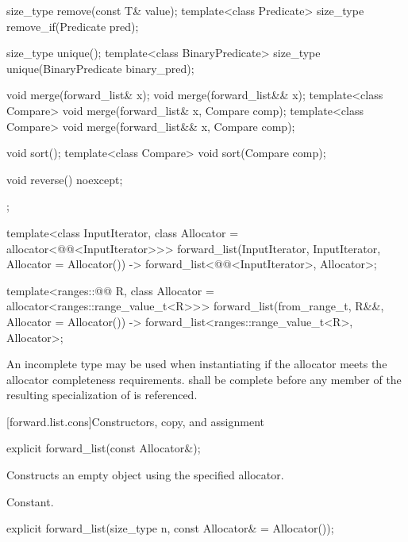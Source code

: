 \begin{codeblock}
{{    size_type remove(const T& value);
    template<class Predicate> size_type remove_if(Predicate pred);

    size_type unique();
    template<class BinaryPredicate> size_type unique(BinaryPredicate binary_pred);

    void merge(forward_list& x);
    void merge(forward_list&& x);
    template<class Compare> void merge(forward_list& x, Compare comp);
    template<class Compare> void merge(forward_list&& x, Compare comp);

    void sort();
    template<class Compare> void sort(Compare comp);

    void reverse() noexcept;
  };

  template<class InputIterator, class Allocator = allocator<@@<InputIterator>>>
    forward_list(InputIterator, InputIterator, Allocator = Allocator())
      -> forward_list<@@<InputIterator>, Allocator>;

  template<ranges::@@ R, class Allocator = allocator<ranges::range_value_t<R>>>
    forward_list(from_range_t, R&&, Allocator = Allocator())
      -> forward_list<ranges::range_value_t<R>, Allocator>;
}
\end{codeblock}

\pnum
An incomplete type  may be used when instantiating 
if the allocator meets the
allocator completeness requirements.
 shall be complete before any member of the resulting specialization
of  is referenced.

[forward.list.cons]{Constructors, copy, and assignment}

%
\begin{itemdecl}
explicit forward_list(const Allocator&);
\end{itemdecl}

\begin{itemdescr}
\pnum
\effects
Constructs an empty  object using the specified allocator.

\pnum
\complexity
Constant.
\end{itemdescr}

%
\begin{itemdecl}
explicit forward_list(size_type n, const Allocator& = Allocator());
\end{itemdecl}

